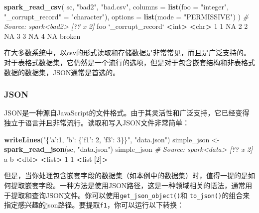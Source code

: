 \documentclass[
]{article}
\newenvironment{Shaded}{\begin{snugshade}}{\end{snugshade}}
\newcommand{\CommentTok}[1]{\textcolor[rgb]{0.56,0.35,0.01}{\textit{#1}}}
\newcommand{\DataTypeTok}[1]{\textcolor[rgb]{0.13,0.29,0.53}{#1}}
\newcommand{\DecValTok}[1]{\textcolor[rgb]{0.00,0.00,0.81}{#1}}
\newcommand{\ErrorTok}[1]{\textcolor[rgb]{0.64,0.00,0.00}{\textbf{#1}}}
\newcommand{\KeywordTok}[1]{\textcolor[rgb]{0.13,0.29,0.53}{\textbf{#1}}}
\newcommand{\NormalTok}[1]{#1}
\newcommand{\OperatorTok}[1]{\textcolor[rgb]{0.81,0.36,0.00}{\textbf{#1}}}
\newcommand{\OtherTok}[1]{\textcolor[rgb]{0.56,0.35,0.01}{#1}}
\newcommand{\StringTok}[1]{\textcolor[rgb]{0.31,0.60,0.02}{#1}}
\begin{document}
\begin{Shaded}
\begin{Highlighting}[]
\KeywordTok{spark_read_csv}\NormalTok{(}
\NormalTok{sc,}
\StringTok{"bad2"}\NormalTok{,}
\StringTok{"bad.csv"}\NormalTok{,}
\DataTypeTok{columns =} \KeywordTok{list}\NormalTok{(}\DataTypeTok{foo =} \StringTok{"integer"}\NormalTok{, }\StringTok{"_corrupt_record"}\NormalTok{ =}\StringTok{ "character"}\NormalTok{),}
\DataTypeTok{options =} \KeywordTok{list}\NormalTok{(}\DataTypeTok{mode =} \StringTok{"PERMISSIVE"}\NormalTok{) )}
\CommentTok{# Source: spark<bad2> [?? x 2]}
\NormalTok{ foo }\StringTok{`}\DataTypeTok{_corrupt_record}\StringTok{`}
 \OperatorTok{<}\NormalTok{int}\OperatorTok{>}\StringTok{ }\ErrorTok{<}\NormalTok{chr}\OperatorTok{>}
\DecValTok{1} \DecValTok{1} \OtherTok{NA}
\DecValTok{2} \DecValTok{2} \OtherTok{NA}
\DecValTok{3} \DecValTok{3} \OtherTok{NA}
\DecValTok{4} \OtherTok{NA}\NormalTok{ broken}
\end{Highlighting}
\end{Shaded}

在大多数系统中，以csv的形式读取和存储数据是非常常见，而且是广泛支持的。对于表格式数据集，它仍然是一个流行的选项，但是对于包含嵌套结构和非表格式数据的数据集，JSON通常是首选的。

\hypertarget{json}{%
\subsubsection{JSON}\label{json}}

JSON是一种源自JavaScript的文件格式。由于其灵活性和广泛支持，它已经变得独立于语言并且非常流行。读取和写入JSON文件非常简单：

\begin{Shaded}
\begin{Highlighting}[]
\KeywordTok{writeLines}\NormalTok{(}\StringTok{"\{'a':1, 'b': \{'f1': 2, 'f3': 3\}\}"}\NormalTok{, }\StringTok{"data.json"}\NormalTok{)}
\NormalTok{simple_json <-}\StringTok{ }\KeywordTok{spark_read_json}\NormalTok{(sc, }\StringTok{"data.json"}\NormalTok{)}
\NormalTok{simple_json}
\CommentTok{# Source: spark<data> [?? x 2]}
\NormalTok{ a b}
 \OperatorTok{<}\NormalTok{dbl}\OperatorTok{>}\StringTok{ }\ErrorTok{<}\NormalTok{list}\OperatorTok{>}
\DecValTok{1} \DecValTok{1} \OperatorTok{<}\NormalTok{list [}\DecValTok{2}\NormalTok{]}\OperatorTok{>}
\end{Highlighting}
\end{Shaded}

但是，当你处理包含嵌套字段的数据集（如本例中的数据集）时，值得一提的是如何提取嵌套字段。一种方法是使用JSON路径，这是一种领域相关的语法，通常用于提取和查询JSON文件。你可以使用\texttt{get\_json\_object()}和
\texttt{to\_json()}的组合来指定感兴趣的json路径。要提取\texttt{f1}，你可以运行以下转换：
\end{document}
